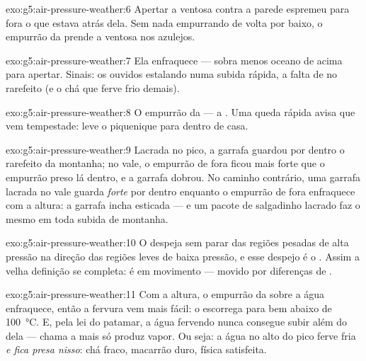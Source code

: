 \begin{solution}{exo:g5:air-pressure-weather:6}
Apertar a ventosa contra a parede espremeu para fora o  que estava
atrás dela. Sem nada empurrando de volta por baixo, o empurrão da
 prende a ventosa nos azulejos.
\end{solution}

\begin{solution}{exo:g5:air-pressure-weather:7}
Ela enfraquece --- sobra menos oceano de  acima para apertar.
Sinais: os ouvidos estalando numa subida rápida, a falta de  no 
rarefeito (e o chá que ferve frio demais).
\end{solution}

\begin{solution}{exo:g5:air-pressure-weather:8}
O empurrão da  --- a . Uma queda rápida
avisa que vem tempestade: leve o piquenique para dentro de casa.
\end{solution}

\begin{solution}{exo:g5:air-pressure-weather:9}
Lacrada no pico, a garrafa guardou por dentro o  rarefeito da
montanha; no vale, o empurrão de fora ficou mais forte que o
empurrão preso lá dentro, e a garrafa dobrou. No caminho contrário,
uma garrafa lacrada no vale guarda  \emph{forte} por dentro
enquanto o empurrão de fora enfraquece com a altura: a garrafa incha
esticada --- e um pacote de salgadinho lacrado faz o mesmo em toda
subida de montanha.
\end{solution}

\begin{solution}{exo:g5:air-pressure-weather:10}
O  despeja sem parar das regiões pesadas de alta pressão na direção
das regiões leves de baixa pressão, e esse despejo é o . Assim a
velha definição se completa:  é  em movimento --- movido por
diferenças de .
\end{solution}

\begin{solution}{exo:g5:air-pressure-weather:11}
Com a altura, o empurrão da  sobre a água enfraquece, então
a fervura vem mais fácil: o  escorrega para bem
abaixo de \qty{100}{\celsius}. E, pela lei do patamar, a água
fervendo nunca consegue subir além do  dela ---
chama a mais só produz vapor. Ou seja: a água no alto do pico ferve
fria \emph{e fica presa nisso}: chá fraco, macarrão duro, física
satisfeita.
\end{solution}
